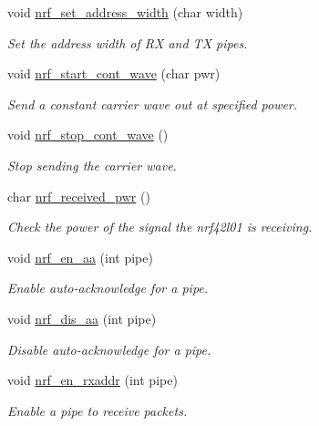\begin{DoxyCompactItemize}
void \hyperlink{group___user_func_ga79ae591959bfbf33e42d91df58447771}{nrf\+\_\+set\+\_\+address\+\_\+width} (char width)
\begin{DoxyCompactList}\small\item\em Set the address width of RX and TX pipes. \end{DoxyCompactList}\item 
void \hyperlink{group___user_func_ga5d7cce4e1b636fabeb1b2f831cb0be88}{nrf\+\_\+start\+\_\+cont\+\_\+wave} (char pwr)
\begin{DoxyCompactList}\small\item\em Send a constant carrier wave out at specified power. \end{DoxyCompactList}\item 
void \hyperlink{group___user_func_ga2a7db2b3a11078b67e7d10f6a84ef151}{nrf\+\_\+stop\+\_\+cont\+\_\+wave} ()
\begin{DoxyCompactList}\small\item\em Stop sending the carrier wave. \end{DoxyCompactList}\item 
char \hyperlink{group___user_func_ga2335bab20b9cea17169bee98a9c69ce1}{nrf\+\_\+received\+\_\+pwr} ()
\begin{DoxyCompactList}\small\item\em Check the power of the signal the nrf42l01 is receiving. \end{DoxyCompactList}\item 
void \hyperlink{group___user_func_gaa8b472c03dfdf4c5057e51014938e2c5}{nrf\+\_\+en\+\_\+aa} (int pipe)
\begin{DoxyCompactList}\small\item\em Enable auto-\/acknowledge for a pipe. \end{DoxyCompactList}\item 
void \hyperlink{group___user_func_ga0c61d78f6f37370e11ebe21fd70f4cc4}{nrf\+\_\+dis\+\_\+aa} (int pipe)
\begin{DoxyCompactList}\small\item\em Disable auto-\/acknowledge for a pipe. \end{DoxyCompactList}\item 
void \hyperlink{group___user_func_gabda8a4fc738cba7e3d6130e635dacff1}{nrf\+\_\+en\+\_\+rxaddr} (int pipe)
\begin{DoxyCompactList}\small\item\em Enable a pipe to receive packets. \end{DoxyCompactList}\item 

\end{DoxyCompactItemize}
